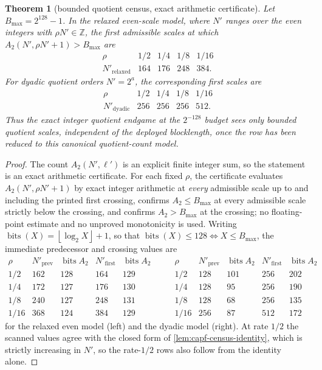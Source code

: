 \documentclass[11pt]{article}
\newtheorem{theorem}{Theorem}[section]
\theoremstyle{definition}
\theoremstyle{remark}
\providecommand{\floor}[1]{\left\lfloor #1\right\rfloor}
\begin{document}
\begin{theorem}[bounded quotient census, exact arithmetic certificate]\label{thm:capf-census}
Let $B_{\max}=2^{128}-1$.  In the relaxed even-scale model, where $N'$ ranges over the even integers with $\rho N'\in\mathbb Z$, the first admissible scales at which $A_2(N',\rho N'+1)>B_{\max}$ are
\[
\begin{array}{c|cccc}
\rho & 1/2 & 1/4 & 1/8 & 1/16\\ \hline
N'_{\mathrm{relaxed}} & 164 & 176 & 248 & 384 .
\end{array}
\]
For dyadic quotient orders $N'=2^a$, the corresponding first scales are
\[
\begin{array}{c|cccc}
\rho & 1/2 & 1/4 & 1/8 & 1/16\\ \hline
N'_{\mathrm{dyadic}} & 256 & 256 & 256 & 512 .
\end{array}
\]
Thus the exact integer quotient endgame at the $2^{-128}$ budget sees only bounded quotient scales, independent of the deployed blocklength, once the row has been reduced to this canonical quotient-count model.
\end{theorem}

\begin{proof}
The count $A_2(N',\ell')$ is an explicit finite integer sum, so the statement is an exact arithmetic certificate.  For each fixed $\rho$, the certificate evaluates $A_2(N',\rho N'+1)$ by exact integer arithmetic at \emph{every} admissible scale up to and including the printed first crossing, confirms $A_2\le B_{\max}$ at every admissible scale strictly below the crossing, and confirms $A_2>B_{\max}$ at the crossing; no floating-point estimate and no unproved monotonicity is used.  Writing $\operatorname{bits}(X)=\floor{\log_2X}+1$, so that $\operatorname{bits}(X)\le128\iff X\le B_{\max}$, the immediate predecessor and crossing values are
\[
\begin{array}{c|cc|cc}
\rho & N'_{\mathrm{prev}} & \operatorname{bits} A_2 & N'_{\mathrm{first}} & \operatorname{bits} A_2\\ \hline
1/2  & 162 & 128 & 164 & 129\\
1/4  & 172 & 127 & 176 & 130\\
1/8  & 240 & 127 & 248 & 131\\
1/16 & 368 & 124 & 384 & 129
\end{array}
\qquad
\begin{array}{c|cc|cc}
\rho & N'_{\mathrm{prev}} & \operatorname{bits} A_2 & N'_{\mathrm{first}} & \operatorname{bits} A_2\\ \hline
1/2  & 128 & 101 & 256 & 202\\
1/4  & 128 &  95 & 256 & 190\\
1/8  & 128 &  68 & 256 & 135\\
1/16 & 256 &  87 & 512 & 172
\end{array}
\]
for the relaxed even model \textup{(left)} and the dyadic model \textup{(right)}.  At rate $1/2$ the scanned values agree with the closed form of \cref{lem:capf-census-identity}, which is strictly increasing in $N'$, so the rate-$1/2$ rows also follow from the identity alone.
\end{proof}
\end{document}
